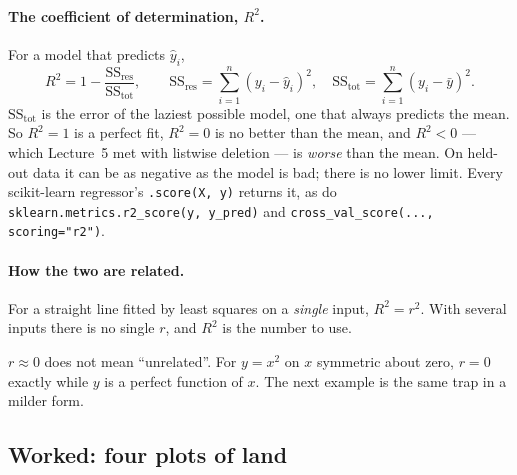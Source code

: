 \documentclass[11pt]{article}
\begin{document}
\paragraph{The coefficient of determination, $R^2$.} For a model that
predicts $\hat y_i$,
\begin{equation}
  R^2 = 1 - \frac{\mathrm{SS}_{\mathrm{res}}}{\mathrm{SS}_{\mathrm{tot}}}, \qquad
  \mathrm{SS}_{\mathrm{res}} = \sum_{i=1}^{n} (y_i - \hat y_i)^2, \quad
  \mathrm{SS}_{\mathrm{tot}} = \sum_{i=1}^{n} (y_i - \bar y)^2 .
  \label{eq:r2}
\end{equation}
$\mathrm{SS}_{\mathrm{tot}}$ is the error of the laziest possible model, one
that always predicts the mean. So $R^2 = 1$ is a perfect fit, $R^2 = 0$ is no
better than the mean, and $R^2 < 0$ --- which Lecture~5 met with listwise
deletion --- is \emph{worse} than the mean. On held-out data it can be as
negative as the model is bad; there is no lower limit. Every scikit-learn
regressor's \texttt{.score(X, y)} returns it, as do
\texttt{sklearn.metrics.r2\_score(y, y\_pred)} and
\texttt{cross\_val\_score(..., scoring="r2")}.

\paragraph{How the two are related.} For a straight line fitted by least
squares on a \emph{single} input, $R^2 = r^2$. With several inputs there is no
single $r$, and $R^2$ is the number to use.

\begin{caution}
$r \approx 0$ does not mean ``unrelated''. For $y = x^2$ on $x$ symmetric
about zero, $r = 0$ exactly while $y$ is a perfect function of $x$. The next
example is the same trap in a milder form.
\end{caution}

\subsection{Worked: four plots of land}
\label{sec:land}
\end{document}

